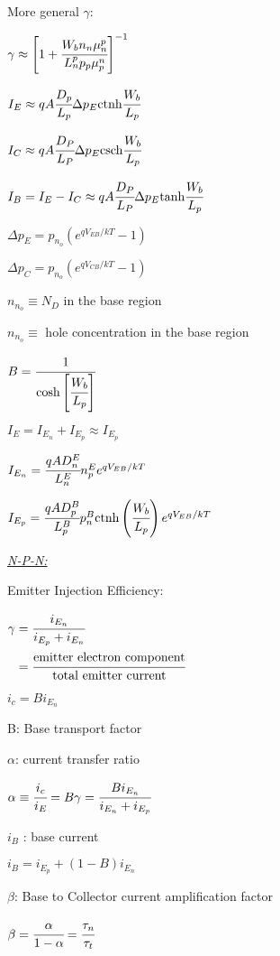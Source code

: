 \documentclass{article}
\begin{document}
{\begin{multicols*}{2}
		\noindent More general $\gamma$:
		
		$\gamma \approx \left[ 1 + \cfrac{W_bn_n\mu_n^p}{L_n^pp_p\mu_p^n} \right]^{-1}$
		
		\noindent $I_E \approx qA\cfrac{D_p}{L_p}\Delta p_E \text{ctnh} \cfrac{W_b}{L_p}$
		
		\noindent $I_C \approx qA\cfrac{D_P}{L_P}\Delta p_E \text{csch} \cfrac{W_b}{L_p}$
		
		\noindent $I_B = I_E - I_C \approx qA\cfrac{D_P}{L_P}\Delta p_E \text{tanh} \cfrac{W_b}{L_p}$
		
		\noindent $\Delta p_E = p_{n_o} \left(e^{qV_{EB}/kT}-1\right)$
		
		\noindent $\Delta p_C = p_{n_o} \left(e^{qV_{CB}/kT}-1\right)$
		
		\noindent $n_{n_o} \equiv N_D$ in the base region 
		
		\noindent $n_{n_o} \equiv$ hole concentration in the base region 
		
		\noindent $B = \cfrac{1}{\cosh\left[\cfrac{W_b}{L_p}\right]}$
		
		\noindent $I_E = I_{E_n} + I_{E_p} \approx I_{E_p}$
		
		\noindent $I_{E_n} = \cfrac{qAD_n^E}{L_n^E} n_p^Ee^{qV_{EB}/kT}$
		
		\noindent $I_{E_p} = \cfrac{qAD_p^B}{L_p^B}p_n^B \text{ctnh}\left(\cfrac{W_b}{L_p}\right) e^{qV_{EB}/kT}$
		
		\noindent\underline{\textit{N-P-N:}}
		
		\noindent Emitter Injection Efficiency:
		
		$\begin{aligned}
		\gamma &= \cfrac{i_{E_n}}{i_{E_p} + i_{E_n}} \\
		&= \cfrac{\text{emitter electron component}}{\text{total emitter current}}
		\end{aligned}$
		
		$i_c = B i_{E_n}$
		
		\noindent B: Base transport factor
		
		\noindent $\alpha$: current transfer ratio
		
		$\alpha \equiv \cfrac{i_c}{i_E} = B\gamma = \cfrac{Bi_{E_n}}{i_{E_n} + i_{E_p}}$
		
		\noindent $i_B$ : base current
		
		$i_B = i_{E_p} + (1-B) i_{E_n}$
		
		\noindent $\beta$: Base to Collector current amplification factor
		
		$\beta = \cfrac{\alpha}{1-\alpha} = \cfrac{\tau_n}{\tau_t}$
		

\end{multicols*}}
\end{document}
